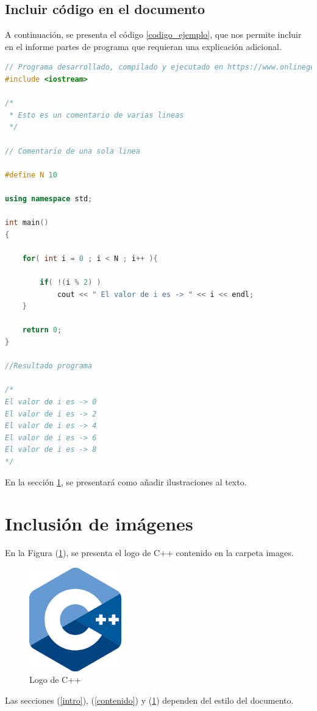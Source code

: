 \documentclass{article}
\begin{document}
\subsection{Incluir código en el documento}
%
A continuación, se presenta el código \ref{codigo_ejemplo}, que nos permite incluir en el informe partes de programa que requieran una explicación adicional.
\begin{lstlisting}[language=C++, label=codigo_ejemplo]
// Programa desarrollado, compilado y ejecutado en https://www.onlinegdb.com
#include <iostream>

/*
 * Esto es un comentario de varias lineas
 */

// Comentario de una sola linea

#define N 10

using namespace std;

int main()
{
    
    for( int i = 0 ; i < N ; i++ ){
        
        if( !(i % 2) )
            cout << " El valor de i es -> " << i << endl;
    }
    
    return 0;
}

//Resultado programa

/*
El valor de i es -> 0
El valor de i es -> 2
El valor de i es -> 4
El valor de i es -> 6
El valor de i es -> 8
*/
\end{lstlisting}
En la sección \ref{imagenes}, se presentará como añadir ilustraciones al texto.

\section{Inclusión de imágenes} \label{imagenes}

En la Figura (\ref{fig:cpplogo}), se presenta el logo de C++ contenido en la carpeta images.

\begin{figure}[h]
\includegraphics[width=4cm]{cpplogo.png}
\centering
\caption{Logo de C++}
\label{fig:cpplogo}
\end{figure}

Las secciones (\ref{intro}), (\ref{contenido}) y (\ref{imagenes}) dependen del estilo del documento.



\end{document}
